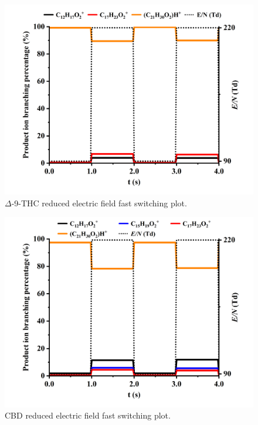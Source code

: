 \begin{figure}[htb]
\centering
\includegraphics[width=0.80\linewidth]{pics/other_drugs/THC-fs-90-220.png}
\caption{$\Delta$-9-THC reduced electric field fast switching plot.}
\label{fig:DR_THC_fs}
\end{figure}



\begin{figure}[htb]
\centering
\includegraphics[width=0.80\linewidth]{pics/other_drugs/CBD-fs-90-220.png}
\caption{CBD reduced electric field fast switching plot.}
\label{fig:DR_CBD_fs}
\end{figure}














